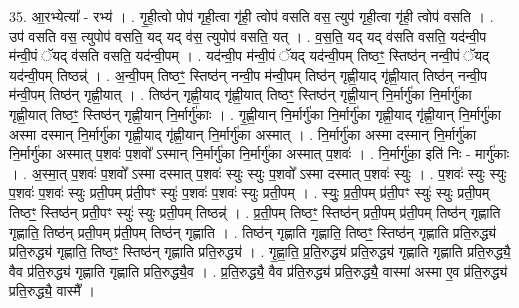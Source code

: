 \documentclass[17pt]{extarticle}
\begin{document}
35. आ॒रभ्येत्या᳚ - रभ्य॑ । . गृ॒ही॒त्वो पोप॑ गृही॒त्वा गृ॑ही॒ त्वोप॑ वसति वस॒ त्युप॑ गृही॒त्वा गृ॑ही॒ त्वोप॑ वसति । . उप॑ वसति वस॒ त्युपोप॑ वसति॒ यद् यद् व॑स॒ त्युपोप॑ वसति॒ यत् । . व॒स॒ति॒ यद् यद् व॑सति वसति॒ यद॑न्वी॒प म॑न्वी॒पं ॅयद् व॑सति वसति॒ यद॑न्वी॒पम् । . यद॑न्वी॒प म॑न्वी॒पं ॅयद् यद॑न्वी॒पम् तिष्ठꣳ॒॒ स्तिष्ठ॑न् नन्वी॒पं ॅयद् यद॑न्वी॒पम् तिष्ठन्न्॑ । . अ॒न्वी॒पम् तिष्ठꣳ॒॒ स्तिष्ठ॑न् नन्वी॒प म॑न्वी॒पम् तिष्ठ॑न् गृह्णी॒याद् गृ॑ह्णी॒यात् तिष्ठ॑न् नन्वी॒प म॑न्वी॒पम् तिष्ठ॑न् गृह्णी॒यात् । . तिष्ठ॑न् गृह्णी॒याद् गृ॑ह्णी॒यात् तिष्ठꣳ॒॒ स्तिष्ठ॑न् गृह्णी॒यान् नि॒र्मार्गु॑का नि॒र्मार्गु॑का गृह्णी॒यात् तिष्ठꣳ॒॒ स्तिष्ठ॑न् गृह्णी॒यान् नि॒र्मार्गु॑काः । . गृ॒ह्णी॒यान् नि॒र्मार्गु॑का नि॒र्मार्गु॑का गृह्णी॒याद् गृ॑ह्णी॒यान् नि॒र्मार्गु॑का अस्मा दस्मान् नि॒र्मार्गु॑का गृह्णी॒याद् गृ॑ह्णी॒यान् नि॒र्मार्गु॑का अस्मात् । . नि॒र्मार्गु॑का अस्मा दस्मान् नि॒र्मार्गु॑का नि॒र्मार्गु॑का अस्मात् प॒शवः॑ प॒शवो᳚ ऽस्मान् नि॒र्मार्गु॑का नि॒र्मार्गु॑का अस्मात् प॒शवः॑ । . नि॒र्मार्गु॑का॒ इति॑ निः - मार्गु॑काः । . अ॒स्मा॒त् प॒शवः॑ प॒शवो᳚ ऽस्मा दस्मात् प॒शवः॑ स्युः स्युः प॒शवो᳚ ऽस्मा दस्मात् प॒शवः॑ स्युः । . प॒शवः॑ स्युः स्युः प॒शवः॑ प॒शवः॑ स्युः प्रती॒पम् प्र॑ती॒पꣳ स्युः॑ प॒शवः॑ प॒शवः॑ स्युः प्रती॒पम् । . स्युः॒ प्र॒ती॒पम् प्र॑ती॒पꣳ स्युः॑ स्युः प्रती॒पम् तिष्ठꣳ॒॒ स्तिष्ठ॑न् प्रती॒पꣳ स्युः॑ स्युः प्रती॒पम् तिष्ठन्न्॑ । . प्र॒ती॒पम् तिष्ठꣳ॒॒ स्तिष्ठ॑न् प्रती॒पम् प्र॑ती॒पम् तिष्ठ॑न् गृह्णाति गृह्णाति॒ तिष्ठ॑न् प्रती॒पम् प्र॑ती॒पम् तिष्ठ॑न् गृह्णाति । . तिष्ठ॑न् गृह्णाति गृह्णाति॒ तिष्ठꣳ॒॒ स्तिष्ठ॑न् गृह्णाति प्रति॒रुद्ध्य॑ प्रति॒रुद्ध्य॑ गृह्णाति॒ तिष्ठꣳ॒॒ स्तिष्ठ॑न् गृह्णाति प्रति॒रुद्ध्य॑ । . गृ॒ह्णा॒ति॒ प्र॒ति॒रुद्ध्य॑ प्रति॒रुद्ध्य॑ गृह्णाति गृह्णाति प्रति॒रुद्ध्यै॒ वैव प्र॑ति॒रुद्ध्य॑ गृह्णाति गृह्णाति प्रति॒रुद्ध्यै॒व । . प्र॒ति॒रुद्ध्यै॒ वैव प्र॑ति॒रुद्ध्य॑ प्रति॒रुद्ध्यै॒ वास्मा॑ अस्मा ए॒व प्र॑ति॒रुद्ध्य॑ प्रति॒रुद्ध्यै॒ वास्मै᳚ । \newline
\end{document}
